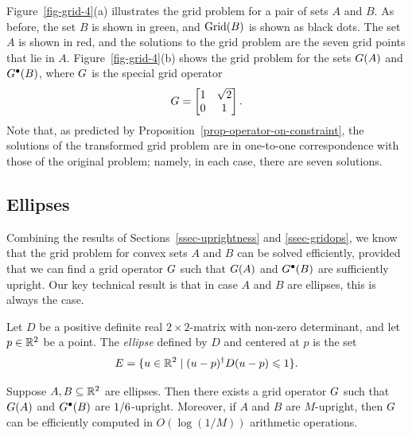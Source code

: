 \documentclass{article}
\begin{document}
\begin{example}
  Figure~\ref{fig-grid-4}(a) illustrates the grid problem for a pair
  of sets $A$ and $B$. As before, the set $B$ is shown in green, and
  $\mathop{\rm Grid}\nolimits(B)$ is shown as black dots. The set $A$ is shown in red, and
  the solutions to the grid problem are the seven grid points that lie
  in $A$.  Figure~\ref{fig-grid-4}(b) shows the grid problem for the
  sets $G(A)$ and $G^{\bullet}(B)$, where $G$ is the special grid operator
  \[ G = \left[\begin{matrix} 1 & \sqrt2 \\ 0 & 1\end{matrix}\right].
  \]
  Note that, as predicted by
  Proposition~\ref{prop-operator-on-constraint}, the solutions of the
  transformed grid problem are in one-to-one correspondence with those
  of the original problem; namely, in each case, there are seven
  solutions.
\end{example}

\subsection{Ellipses}\label{ssec-ellipses}

Combining the results of Sections~\ref{ssec-uprightness} and
{\ref{ssec-gridops}}, we know that the grid problem for convex sets
$A$ and $B$ can be solved efficiently, provided that we can find a
grid operator $G$ such that $G(A)$ and $G^{\bullet}(B)$ are sufficiently
upright. Our key technical result is that in case $A$ and $B$ are
ellipses, this is always the case.

\begin{definition}
\label{def-ellipses}
  Let $D$ be a positive definite real $2\times 2$-matrix with non-zero
  determinant, and let $p\in {\mathbb{R}}^2$ be a point. The {\em ellipse}
  defined by $D$ and centered at $p$ is the set
  \[ E = \{u\in{\mathbb{R}}^2 \mid (u-p)^{\dagger} D(u-p) \leqslant 1\}.
  \]
\end{definition}

\begin{theorem}\label{thm-ellipse}
  Suppose $A,B\subseteq {\mathbb{R}}^2$ are ellipses. Then there exists a grid
  operator $G$ such that $G(A)$ and $G^\bullet (B)$ are
  $1/\formula{\oneoverM}$-upright. Moreover, if $A$ and $B$ are
  $M$-upright, then $G$ can be efficiently computed in $O(\log(1/M))$
  arithmetic operations.
\end{theorem}
\end{document}
